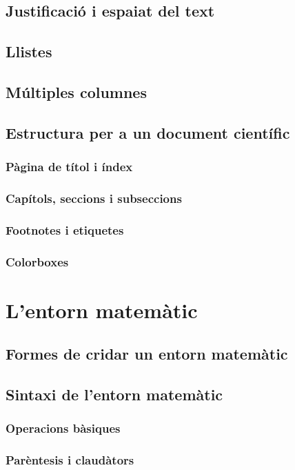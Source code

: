 \documentclass[15pt,twosides,onecolumn,openany]{book}
\begin{document}
\section{Justificació i espaiat del text}
\section{Llistes}
\section{Múltiples columnes}
\section{Estructura per a un document científic}
\subsection{Pàgina de títol i índex}
\subsection{Capítols, seccions i subseccions}\label{sec:cap_sec_subsec}
\subsection{Footnotes i etiquetes}
\subsection{Colorboxes}

\chapter{L'entorn matemàtic}
\section{Formes de cridar un entorn matemàtic}
\section{Sintaxi de l'entorn matemàtic}
\subsection{Operacions bàsiques}
\subsection{Parèntesis i claudàtors}
\end{document}
